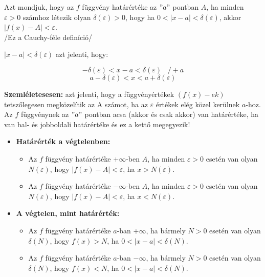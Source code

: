 \documentclass[12pt,a4paper]{article}
\begin{document}
\begin{tcolorbox}[colback=green!5!white,colframe=green!60!black,title= 2. Függvény határérték]
Azt mondjuk, hogy az \(f\) függvény határértéke az \("a"\) pontban \(A\), ha minden \(\varepsilon > 0\) számhoz
létezik olyan \(\delta(\varepsilon)  > 0\), hogy ha \(0 < \left\lvert x-a \right\rvert  < \delta(\varepsilon)\), akkor \(|f(x) - A| < \varepsilon\).\\
/Ez a Cauchy-féle definíció/\\
\begin{center}
    \(|x - a| < \delta(\varepsilon)\) azt jelenti, hogy:
\end{center}
    $$- \delta(\varepsilon) < x - a < \delta(\varepsilon) \hspace{10pt} /+a$$
    $$a - \delta(\varepsilon) < x < a + \delta(\varepsilon)$$

\textbf{Szemléletesesen:} azt jelenti, hogy a függvényértékek \((f(x)-ek)\) tetszőlegesen megközelítik az
A számot, ha az \(\varepsilon\) értékek elég közel kerülnek \(a\)-hoz. Az \(f\) függvénynek az \("a"\) pontban acsa (akkor és csak akkor) van határértéke, ha van bal- és
jobboldali határértéke és ez a kettő megegyezik!
\begin{itemize}
    \item \textbf{Határérték a végtelenben:}
    \begin{itemize}
        \item Az \(f\) függvény határértéke \(+\infty\)-ben \(A\), ha minden \(\varepsilon > 0\) esetén van olyan \(N(\varepsilon)\), hogy
    \(|f(x) - A| < \varepsilon\), ha \(x > N(\varepsilon)\).
        \item Az \(f\) függvény határértéke \(-\infty\)-ben \(A\), ha minden \(\varepsilon > 0\) esetén van olyan \(N(\varepsilon)\), hogy
    \(|f(x) - A| < \varepsilon\), ha \(x < N(\varepsilon)\).
    \end{itemize}
    \item \textbf{A végtelen, mint határérték:}
    \begin{itemize}
        \item Az \(f\) függvény határértéke \(a\)-ban \(+ \infty\), ha bármely \(N > 0\) esetén van olyan \(\delta(N)\), hogy \(f(x) > N\), ha \(0 < |x - a| < \delta(N)\).
        \item Az \(f\) függvény határértéke \(a\)-ban \(- \infty\), ha bármely \(N > 0\) esetén van olyan \(\delta(N)\), hogy \(f(x) < N\), ha \(0 < |x - a| < \delta(N)\).
    \end{itemize}
\end{itemize}
\end{tcolorbox}
\end{document}
